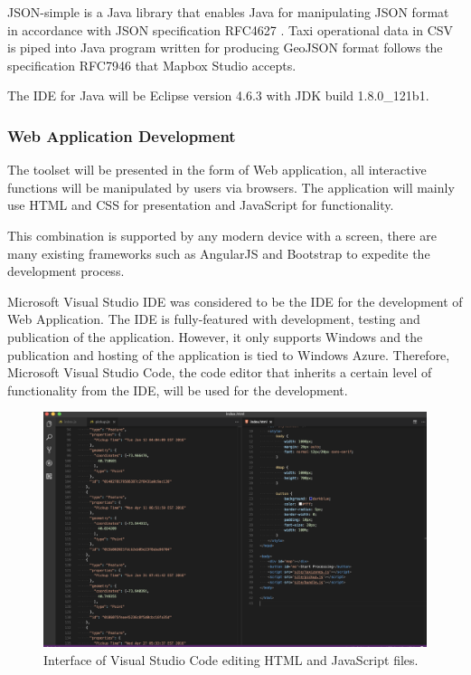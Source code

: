 \documentclass[doc,natbib]{apa6}
\begin{document}
JSON-simple \citep{Fang} is a Java library that enables Java for manipulating JSON format in accordance with JSON specification RFC4627 \citep{JSON}. Taxi operational data in CSV is piped into Java program written for producing GeoJSON format follows the specification RFC7946 \citep{GeoJSON} that Mapbox Studio accepts.

The IDE for Java will be Eclipse version 4.6.3 with JDK build 1.8.0\_121\-b1.
\subsubsection{Web Application Development}\hfil\newline
The toolset will be presented in the form of Web application, all interactive functions will be manipulated by users via browsers. The application will mainly use HTML and CSS for presentation and JavaScript for functionality.

This combination is supported by any modern device with a screen, there are many existing frameworks such as AngularJS and Bootstrap to expedite the development process.

Microsoft Visual Studio IDE was considered to be the IDE for the development of Web Application. The IDE is fully-featured with development, testing and publication of the application. However, it only supports Windows and the publication and hosting of the application is tied to Windows Azure. Therefore, Microsoft Visual Studio Code, the code editor that inherits a certain level of functionality from the IDE, will be used for the development. 

\begin{figure}[H]
	\centering
	\includegraphics[width=\textwidth,keepaspectratio]{figures/fig16.png}
	\caption{\label{fig:16}Interface of Visual Studio Code editing HTML and JavaScript files. }
\end{figure}
\end{document}
